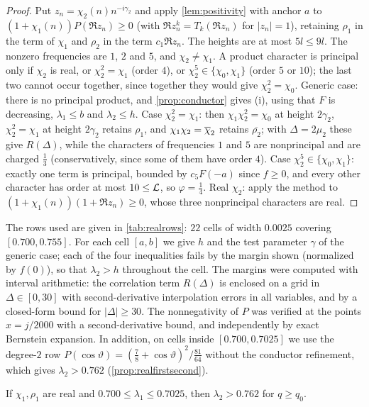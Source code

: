 \begin{proof}
Put $z_n=\chi_2(n)n^{-i\gamma_2}$ and apply \cref{lem:positivity} with anchor $a$ to
$(1+\chi_1(n))P(\Re z_n)\ge0$ (with $\Re z_n^k=T_k(\Re z_n)$ for $|z_n|=1$), retaining $\rho_1$ in the term of $\chi_1$
and $\rho_2$ in the term $c_1\Re z_n$. The heights are at most $5l\le9l$. The nonzero frequencies are
$1$, $2$ and $5$, and $\chi_2\ne\chi_1$. A product character is principal only if $\chi_2$ is real, or
$\chi_2^2=\chi_1$ (order $4$), or $\chi_2^5\in\{\chi_0,\chi_1\}$ (order $5$ or $10$); the last two cannot
occur together, since together they would give $\chi_2^2=\chi_0$. Generic case: there is no principal
product, and \cref{prop:conductor} gives (i), using that $F$ is decreasing, $\lambda_1\le b$ and $\lambda_2\le h$.
Case $\chi_2^2=\chi_1$: then $\chi_1\chi_2^2=\chi_0$ at height $2\gamma_2$, $\chi_2^2=\chi_1$ at height $2\gamma_2$
retains $\rho_1$, and $\chi_1\chi_2=\overline{\chi}_2$ retains $\overline{\rho_2}$; with $\Delta=2\mu_2$ these give $R(\Delta)$,
while the characters of frequencies $1$ and $5$ are nonprincipal and are charged $\frac13$ (conservatively,
since some of them have order $4$). Case
$\chi_2^5\in\{\chi_0,\chi_1\}$: exactly one term is principal, bounded by $c_5F(-a)$ since $f\ge0$, and
every other character has order at most $10\le\mathcal{L}$, so $\varphi=\frac14$. Real $\chi_2$: apply the
method to $(1+\chi_1(n))(1+\Re z_n)\ge0$, whose three nonprincipal characters are real.
\end{proof}

The rows used are given in \cref{tab:realrows}: $22$ cells of width $0.0025$ covering $[0.700,0.755]$.
For each cell $[a,b]$ we give $h$ and the test parameter $\gamma$ of the generic case; each of the four
inequalities fails by the margin shown (normalized by $f(0)$), so that $\lambda_2>h$ throughout the
cell. The margins were computed with interval arithmetic: the correlation term $R(\Delta)$ is enclosed
on a grid in $\Delta\in[0,30]$ with second-derivative interpolation errors in all variables, and by a
closed-form bound for $|\Delta|\ge30$. The nonnegativity of $P$ was verified at the points
$x=j/2000$ with a second-derivative bound, and independently by exact Bernstein expansion. In
addition, on cells inside $[0.700,0.7025]$ we use the degree-$2$ row
$P(\cos\vartheta)=(\frac78+\cos\vartheta)^2/\frac{81}{64}$ without the conductor refinement, which gives
$\lambda_2>0.762$ (\cref{prop:realfirstsecond}).

\begin{proposition}\label{prop:realfirstsecond}
If $\chi_1,\rho_1$ are real and $0.700\le\lambda_1\le0.7025$, then $\lambda_2>0.762$ for $q\ge q_0$.
\end{proposition}

